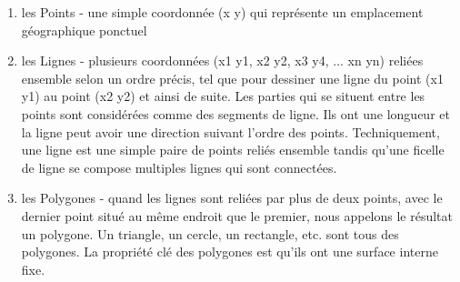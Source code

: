 \begin{enumerate} 
\item les Points - une simple coordonnée (x y) qui représente un emplacement géographique ponctuel 
\item les Lignes - plusieurs coordonnées (x1 y1, x2 y2, x3 y4, ... xn yn) reliées ensemble selon un ordre précis, tel que pour dessiner une ligne du point (x1 y1) au point (x2 y2) et ainsi de suite. Les parties qui se situent entre les points sont considérées comme des segments de ligne. Ils ont une longueur et la ligne peut avoir une direction suivant l'ordre des points. Techniquement, une ligne est une simple paire de points reliés ensemble tandis qu'une ficelle de ligne se compose multiples lignes qui sont connectées.
\item les Polygones - quand les lignes sont reliées par plus de deux points, avec le dernier point situé au même endroit que le premier, nous appelons le résultat un polygone. Un triangle, un cercle, un rectangle, etc. sont tous des polygones. La propriété clé des polygones est qu'ils ont une surface interne fixe.
\end{enumerate}
